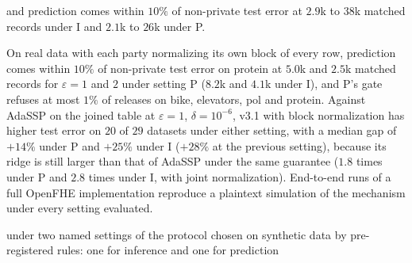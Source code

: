 and prediction comes within $10\%$ of non-private test error at $2.9$k to $38$k matched records under I and $2.1$k to $26$k under P.

On real data with each party normalizing its own block of every row, prediction comes within $10\%$ of non-private test error on protein at $5.0$k and $2.5$k matched records for $\varepsilon = 1$ and $2$ under setting P ($8.2$k and $4.1$k under I), and P's gate refuses at most $1\%$ of releases on bike, elevators, pol and protein. Against AdaSSP on the joined table at $\varepsilon = 1$, $\delta = 10^{-6}$, v3.1 with block normalization has higher test error on $20$ of $29$ datasets under either setting, with a median gap of $+14\%$ under P and $+25\%$ under I ($+28\%$ at the previous setting), because its ridge is still larger than that of AdaSSP under the same guarantee ($1.8$ times under P and $2.8$ times under I, with joint normalization). End-to-end runs of a full OpenFHE implementation reproduce a plaintext simulation of the mechanism under every setting evaluated.

under two named settings of the protocol chosen on synthetic data by pre-registered rules: one for inference and one for prediction

